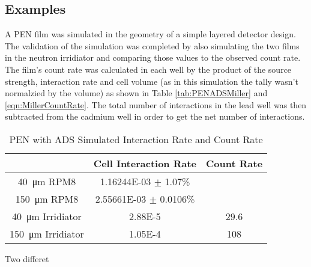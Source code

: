 \documentclass[draftcls,onecolumn]{IEEEtran}
\begin{document}
\subsection{Examples}
\begin{Exercise*}[label={PEN LiF with ADS},title={PEN LiF film with ADS},name={Example}]

A PEN film was simulated in the geometry of a simple layered detector design.
The validation of the simulation was completed by also simulating the two films in the neutron irridiator and comparing those values to the observed count rate.
The film's count rate was calculated in each well by the product of the source strength, interaction rate and cell volume (as in this simulation the tally wasn't normalzied by the volume) as shown in Table \ref{tab:PENADSMiller} and \eqref{eqn:MillerCountRate}.
The total number of interactions in the lead well was then subtracted from the cadmium well in order to get the net number of interactions.
\begin{table}
  \centering
  \caption{PEN with ADS Simulated Interaction Rate and Count Rate}
  \label{tab:PENADPerformace}
  \begin{tabular}{c | c c}
    & Cell Interaction Rate & Count Rate \\
    \hline
    \hline
   \SI{40}{\um}  RPM8 & \num{1.16244E-03} $\pm$ 1.07\% & \\
   \SI{150}{\um} RPM8 & \num{2.55661E-03} $\pm$ 0.0106\% & \\
   \hline
   \SI{40}{\um}  Irridiator & \num{2.88E-5} & 29.6 \\
   \SI{150}{\um} Irridiator & \num{1.05E-4} & 108 \\
  \end{tabular}
\end{table}

Two differet


\end{Exercise*}
\end{document}
